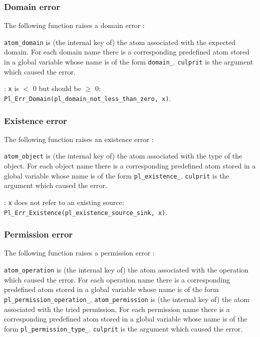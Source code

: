 \subsubsection{Domain error}
The following function raises a domain error :


\texttt{atom\_domain} is (the internal key of) the atom associated with the
expected domain. For each domain name  there is a
corresponding predefined atom stored in a global variable whose name is of
the form \texttt{domain\_}. \texttt{culprit} is the argument which
caused the error.

: \texttt{x} is $<$ 0 but should be $\geq$ 0:
\texttt{Pl\_Err\_Domain(pl\_domain\_not\_less\_than\_zero, x)}.

\subsubsection{Existence error}
The following function raises an existence error :


\texttt{atom\_object} is (the internal key of) the atom associated with the
type of the object. For each object name  there is a
corresponding predefined atom stored in a global variable whose name is of
the form \texttt{pl\_existence\_}. \texttt{culprit} is the argument
which caused the error.

: \texttt{x} does not refer to an existing source:
\texttt{Pl\_Err\_Existence(pl\_existence\_source\_sink, x)}.

\subsubsection{Permission error}
The following function raises a permission error :


\texttt{atom\_operation} is (the internal key of) the atom associated with the
operation which caused the error. For each operation name
 there is a corresponding predefined atom stored in a
global variable whose name is of the form
\texttt{pl\_permission\_operation\_}. \texttt{atom\_permission} is
(the internal key of) the atom associated with the tried permission. For each
permission name  there is a corresponding predefined atom
stored in a global variable whose name is of the form
\texttt{pl\_permission\_type\_}. \texttt{culprit} is the argument
which caused the error.


